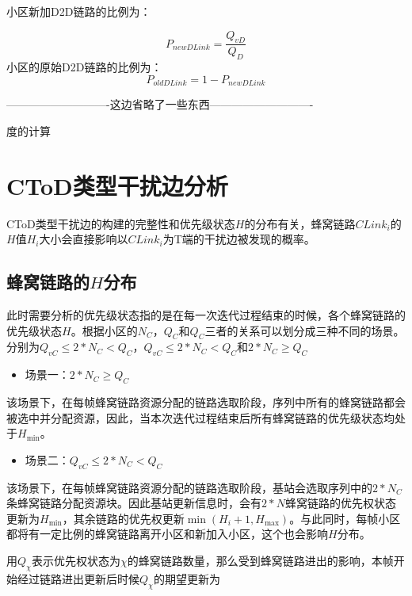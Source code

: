 \documentclass[figurelist,tablelist,algorithmlist,nomlist,masters]{seuthesix}
\begin{document}
	小区新加D2D链路的比例为：
	
	\begin{equation}\label{eq3.3}
	{P_{newDLink}} = \frac{{Q_{vD}}}{{Q_D}}
	\end{equation}
	小区的原始D2D链路的比例为：
	\begin{equation}\label{eq3.4}
	{P_{oldDLink}} = 1 - {P_{newDLink}}
	\end{equation}
	
	----------------------------这边省略了一些东西----------------------------
	
	度的计算
	
	\section{CToD类型干扰边分析}
	CToD类型干扰边的构建的完整性和优先级状态${H}$的分布有关，蜂窝链路${CLink_i}$的${H}$值${H_i}$大小会直接影响以${CLink_i}$为T端的干扰边被发现的概率。
	
	\subsection{蜂窝链路的${H}$分布}
	此时需要分析的优先级状态指的是在每一次迭代过程结束的时候，各个蜂窝链路的优先级状态${H}$。根据小区的$N_C$，$Q_C$和$Q_C$三者的关系可以划分成三种不同的场景。分别为$Q_{vC} \le 2*N_C < Q_C$，$Q_{vC} \le 2*N_C < Q_C$和$2*N_C \ge Q_C$
	
	\begin{itemize}
		\item 场景一：$2*N_C \ge Q_C$
	\end{itemize}
	
	该场景下，在每帧蜂窝链路资源分配的链路选取阶段，序列中所有的蜂窝链路都会被选中并分配资源，因此，当本次迭代过程结束后所有蜂窝链路的优先级状态均处于${H_{\min }}$。
	
	\begin{itemize}
		\item 场景二：$Q_{vC} \le 2*N_C < Q_C$
	\end{itemize}
	
	该场景下，在每帧蜂窝链路资源分配的链路选取阶段，基站会选取序列中的$2*N_C$条蜂窝链路分配资源块。因此基站更新信息时，会有$2*N$蜂窝链路的优先权状态更新为${H_{\min }}$，其余链路的优先权更新$\min ({H_i} + 1,{H_{\max }})$。与此同时，每帧小区都将有一定比例的蜂窝链路离开小区和新加入小区，这个也会影响${H}$分布。
	
	
	用$Q_{\chi }$表示优先权状态为$\chi $的蜂窝链路数量，那么受到蜂窝链路进出的影响，本帧开始经过链路进出更新后时候$Q_{\chi }$的期望更新为
	
\end{document}
